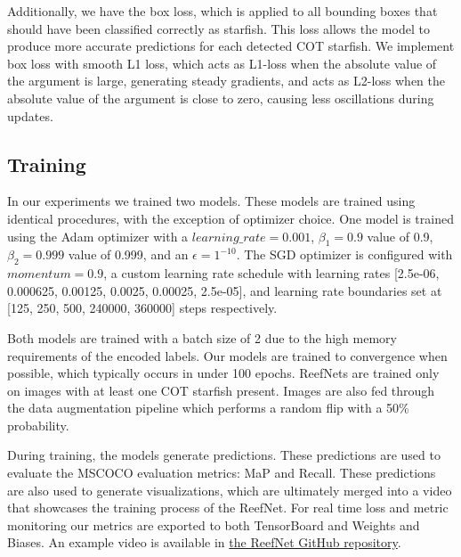 \documentclass{article}
\begin{document}
Additionally, we have the box loss, which is applied to all bounding boxes that should have been classified correctly as starfish.
This loss allows the model to produce more accurate predictions for each detected COT starfish. 
We implement box loss with smooth L1 loss, which acts as L1-loss when the absolute value of the argument is large, generating steady gradients, and acts as L2-loss when the absolute value of the argument is close to zero, causing less oscillations during updates. 

\subsection{Training}

In our experiments we trained two models.  These models are trained using identical procedures, with the exception of optimizer choice.  One model is trained using the Adam optimizer with a $learning\_rate=0.001$, $\beta_1=0.9$ value of 0.9, $\beta_2=0.999$ value of 0.999, and an $\epsilon=1^{-10}$.  The SGD optimizer is configured with $momentum=0.9$, a custom learning rate schedule with learning rates [2.5e-06, 0.000625, 0.00125, 0.0025, 0.00025, 2.5e-05], and learning rate boundaries set at [125, 250, 500, 240000, 360000] steps respectively.

Both models are trained with a batch size of 2 due to the high memory requirements of the encoded labels.  Our models are trained to convergence when possible, which typically occurs in under 100 epochs.
ReefNets are trained only on images with at least one COT starfish present.
Images are also fed through the data augmentation pipeline which performs a random flip with a 50\% probability.

During training, the models generate predictions.  These predictions are used to evaluate the MSCOCO evaluation metrics: MaP and Recall.  These predictions are also used to generate visualizations, which are ultimately merged into a video that showcases the training process of the ReefNet.
For real time loss and metric monitoring our metrics are exported to both TensorBoard and Weights and Biases.
An example video is available in \hyperlink{https://github.com/lukewood/reef-net}{the ReefNet GitHub repository}.
\end{document}
